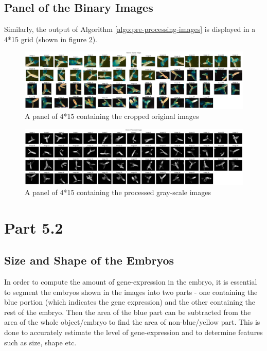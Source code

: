 \documentclass{article}
\begin{document}
\subsection*{Panel of the Binary Images}
Similarly, the output of Algorithm \ref{algo:pre-processing-images} is displayed in a 4*15 grid (shown in figure \ref{fig:panel-binary}). 
\begin{landscape}
    \begin{figure}
    \centering
    \includegraphics[width=1\linewidth, keepaspectratio]{Report/Images/Panel_of_Original_Images.png}
    \caption{A panel of 4*15 containing the cropped original images}
    \label{fig:panel-original}
\end{figure}
\end{landscape}
\clearpage
\begin{landscape}
    \begin{figure}
    \centering
    \includegraphics[width=1\linewidth, keepaspectratio]{Report/Images/Panel_of_Processed_Images.png}
    \caption{A panel of 4*15 containing the processed gray-scale images}
    \label{fig:panel-binary}
\end{figure}
\end{landscape}
\clearpage
\section*{Part 5.2}
\subsection*{Size and Shape of the Embryos}
In order to compute the amount of gene-expression in the embryo, it is essential to segment the embryos shown in the images into two parts - one containing the blue portion (which indicates the gene expression) and the other containing the rest of the embryo. Then the area of the blue part can be subtracted from the area of the whole object/embryo to find the area of non-blue/yellow part. This is done to accurately estimate the level of gene-expression and to determine features such as size, shape etc. 
\end{document}
